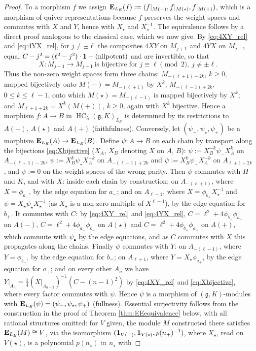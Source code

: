 \documentclass[a4paper,12pt,reqno]{amsart}
\newcommand{\EE}{{\rm\bf E}}
\DeclareMathOperator{\HC}{\mathrm{HC}}
\theoremstyle{plain}
\theoremstyle{remark}
\begin{document}
    \begin{proof}
    To a morphism $f$ we assign $\EE_{L_E}(f):=(f|_{M(-)},f|_{M(\star)},f|_{M(+)})$, which is a morphism of quiver representations because $f$ preserves the weight spaces and commutes with $X$ and $Y$, hence with $X_\star$ and $X_\star^{-1}$. The equivalence follows by a direct proof analogous to the classical case, which we now give. By \eqref{eq:4XY_rel} and \eqref{eq:4YX_rel}, for $j\neq\pm\ell$ the composites $4XY$ on $M_{j+1}$ and $4YX$ on $M_{j-1}$ equal $C-j^2=(\ell^2-j^2)\cdot{\bf1}+(\text{nilpotent})$ and are invertible, so that
    \begin{equation}
      X\colon M_{j-1}\to M_{j+1}\ \text{is bijective for } j\equiv\ell\pmod2,\ j\neq\pm\ell.
      \label{eq:Xbijective}
    \end{equation}
    Thus the non-zero weight spaces form three chains: $M_{-(\ell+1)-2k}$, $k\geq0$, mapped bijectively onto $M(-)=M_{-(\ell+1)}$ by $X^k$; $M_{-(\ell-1)+2k}$, $0\leq k\leq\ell-1$, onto which $M(\star)=M_{-(\ell-1)}$ is mapped bijectively by $X^k$; and $M_{\ell+1+2k}=X^k(M(+))$, $k\geq0$, again with $X^k$ bijective. Hence a morphism $f\colon A\to B$ in $\HC_\lambda(\mathfrak{g}, K)_{L_E}$ is determined by its restrictions to $A(-)$, $A(\star)$ and $A(+)$ (faithfulness). Conversely, let $(\psi_-,\psi_\star,\psi_+)$ be a morphism $\EE_{L_E}(A)\to\EE_{L_E}(B)$. Define $\psi\colon A\to B$ on each chain by transport along the bijections \eqref{eq:Xbijective} ($X_A$, $X_B$ denoting $X$ on $A$, $B$): $\psi:=X_B^{-k}\psi_-X_A^k$ on $A_{-(\ell+1)-2k}$, $\psi:=X_B^k\psi_\star X_A^{-k}$ on $A_{-(\ell-1)+2k}$ and $\psi:=X_B^k\psi_+X_A^{-k}$ on $A_{\ell+1+2k}$, and $\psi:=0$ on the weight spaces of the wrong parity. Then $\psi$ commutes with $H$ and $K$, and with $X$: inside each chain by construction; on $A_{-(\ell+1)}$, where $X=\phi_{a_-}$, by the edge equation for $a_-$; and on $A_{\ell-1}$, where $X=\phi_{b_+}X_\star^{-1}$ and $\psi=X_\star\psi_\star X_\star^{-1}$ (as $X_\star$ is a non-zero multiple of $X^{\ell-1}$), by the edge equation for $b_+$. It commutes with $C$: by \eqref{eq:4XY_rel} and \eqref{eq:4YX_rel}, $C=\ell^2+4\phi_{b_-}\phi_{a_-}$ on $A(-)$, $C=\ell^2+4\phi_{a_-}\phi_{b_-}$ on $A(\star)$ and $C=\ell^2+4\phi_{b_+}\phi_{a_+}$ on $A(+)$, which commute with $\psi_\bullet$ by the edge equations, and as $C$ commutes with $X$ this propagates along the chains. Finally $\psi$ commutes with $Y$: on $A_{-(\ell-1)}$, where $Y=\phi_{b_-}$, by the edge equation for $b_-$; on $A_{\ell+1}$, where $Y=X_\star\phi_{a_+}$, by the edge equation for $a_+$; and on every other $A_n$ we have $Y|_{A_n}=\frac14\left(X|_{A_{n-2}}\right)^{-1}\left(C-(n-1)^2\right)$ by \eqref{eq:4XY_rel} and \eqref{eq:Xbijective}, where every factor commutes with $\psi$. Hence $\psi$ is a morphism of $(\mathfrak{g},K)$-modules with $\EE_{L_E}(\psi)=(\psi_-,\psi_\star,\psi_+)$ (fullness). Essential surjectivity follows from the construction in the proof of Theorem \ref{thm:EEequivalence} below, with all rational structures omitted: for $V$ given, the module $M$ constructed there satisfies $\EE_{L_E}(M)\cong V$, via the isomorphism $({\bf1}_{V(-)},{\bf1}_{V(\star)},p(n_+)^{-1})$, where $X_\star$, read on $V(\star)$, is a polynomial $p(n_\star)$ in $n_\star$ with 
\end{proof}
\end{document}

